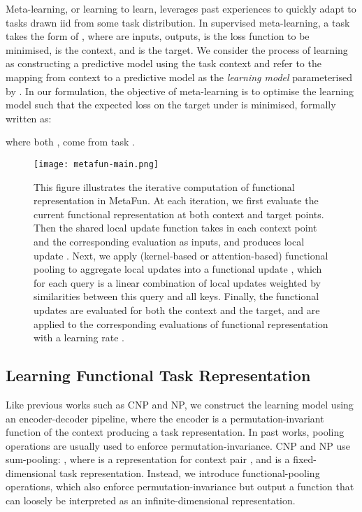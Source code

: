 \documentclass{article}
\theoremstyle{definition}
\begin{document}
Meta-learning, or learning to learn, leverages past experiences to quickly adapt to tasks  drawn iid from some task distribution.
In supervised meta-learning, a task  takes the form of , where  are inputs,  outputs,  is the loss function to be minimised,  is the context, and  is the target. We consider the process of learning as constructing a predictive model using the task context and refer to the mapping from context  to a predictive model  as the \emph{learning model} parameterised by . In our formulation, the objective of meta-learning is to optimise the learning model such that the expected loss on the target under  is minimised, formally written as:

where both ,  come from task .

\begin{figure*}
  \centering
    \texttt{[image: metafun-main.png]}
\caption{This figure illustrates the iterative computation of functional representation in MetaFun. At each iteration, we first evaluate the current functional representation at both context and target points. Then the shared local update function  takes in each context point and the corresponding evaluation as inputs, and produces local update . Next, we apply (kernel-based or attention-based) functional pooling  to aggregate local updates  into a functional update , which for each query is a linear combination of local updates  weighted by similarities between this query and all keys. Finally, the functional updates are evaluated for both the context and the target, and are applied to the corresponding evaluations of functional representation with a learning rate .}
\label{fig:metafun}
\end{figure*}


\subsection{Learning Functional Task Representation} \label{sub:learning task representation}

Like previous works such as \gls{CNP} and \gls{NP}, we construct the learning model using an encoder-decoder pipeline, where the encoder  is a permutation-invariant function of the context producing a task representation.
In past works, pooling operations are usually used to enforce permutation-invariance. \gls{CNP} and \gls{NP} use sum-pooling: , where  is a representation for context pair , and  is a fixed-dimensional task representation. Instead, we introduce functional-pooling operations, which also enforce permutation-invariance but output a function that can loosely be interpreted as an infinite-dimensional representation.
\end{document}
